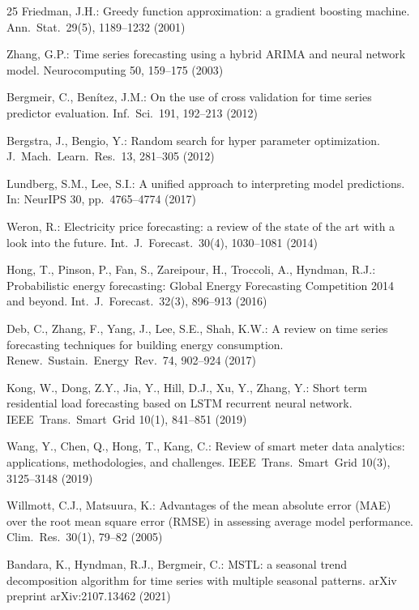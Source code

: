 \documentclass[runningheads]{llncs}
\begin{document}
\begin{thebibliography}{25}
Friedman, J.H.: Greedy function approximation: a gradient boosting machine. Ann.\ Stat.\ 29(5), 1189--1232 (2001)

Zhang, G.P.: Time series forecasting using a hybrid {ARIMA} and neural network model. Neurocomputing 50, 159--175 (2003)

Bergmeir, C., Ben{\'i}tez, J.M.: On the use of cross validation for time series predictor evaluation. Inf.\ Sci.\ 191, 192--213 (2012)

Bergstra, J., Bengio, Y.: Random search for hyper parameter optimization. J.\ Mach.\ Learn.\ Res.\ 13, 281--305 (2012)

Lundberg, S.M., Lee, S.I.: A unified approach to interpreting model predictions. In: NeurIPS 30, pp.\ 4765--4774 (2017)

Weron, R.: Electricity price forecasting: a review of the state of the art with a look into the future. Int.\ J.\ Forecast.\ 30(4), 1030--1081 (2014)

Hong, T., Pinson, P., Fan, S., Zareipour, H., Troccoli, A., Hyndman, R.J.: Probabilistic energy forecasting: Global Energy Forecasting Competition 2014 and beyond. Int.\ J.\ Forecast.\ 32(3), 896--913 (2016)

Deb, C., Zhang, F., Yang, J., Lee, S.E., Shah, K.W.: A review on time series forecasting techniques for building energy consumption. Renew.\ Sustain.\ Energy\ Rev.\ 74, 902--924 (2017)

Kong, W., Dong, Z.Y., Jia, Y., Hill, D.J., Xu, Y., Zhang, Y.: Short term residential load forecasting based on {LSTM} recurrent neural network. IEEE\ Trans.\ Smart\ Grid 10(1), 841--851 (2019)

Wang, Y., Chen, Q., Hong, T., Kang, C.: Review of smart meter data analytics: applications, methodologies, and challenges. IEEE\ Trans.\ Smart\ Grid 10(3), 3125--3148 (2019)

Willmott, C.J., Matsuura, K.: Advantages of the mean absolute error ({MAE}) over the root mean square error ({RMSE}) in assessing average model performance. Clim.\ Res.\ 30(1), 79--82 (2005)

Bandara, K., Hyndman, R.J., Bergmeir, C.: {MSTL}: a seasonal trend decomposition algorithm for time series with multiple seasonal patterns. arXiv preprint arXiv:2107.13462 (2021)


\end{thebibliography}
\end{document}
